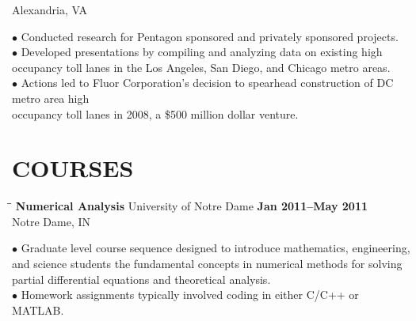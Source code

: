 \documentclass{resume}
\begin{document}
\begin{resume}
\begin{tabbing}
		\>Alexandria, VA
	\end{tabbing}\vspace{-15pt}
	$\bullet$ Conducted research for Pentagon sponsored and privately
	sponsored projects. 
	\\ 
	$\bullet$ Developed presentations by compiling and
	analyzing data on existing high occupancy toll lanes in 
	\phantom{$\bullet$} the Los
	Angeles, San Diego, and
	Chicago metro areas.  
	\\
	$\bullet$ Actions led to Fluor Corporation's decision to
	spearhead construction of DC metro area high \\
	\phantom{$\bullet$} occupancy toll lanes
	in 2008, a \$500
	million dollar venture.
	\newpage
		 \section{COURSES}
	\vspace{0.05in}	
    \begin{tabbing}
		\hspace{2.3in}\= \hspace{2.6in}\= \kill
        {\bf Numerical Analysis} \>University of Notre Dame    
	\>\textbf{Jan 2011--May 2011} \\
		\>Notre Dame, IN 
	\end{tabbing}\vspace{-15pt}    
	$\bullet$ Graduate 
level course sequence designed to introduce mathematics, engineering, and science students the fundamental concepts in numerical 
methods for solving partial differential equations and theoretical analysis. 
\\
$\bullet$ Homework assignments
typically involved coding in either C/C++ or MATLAB.  


\end{resume}
\end{document}

